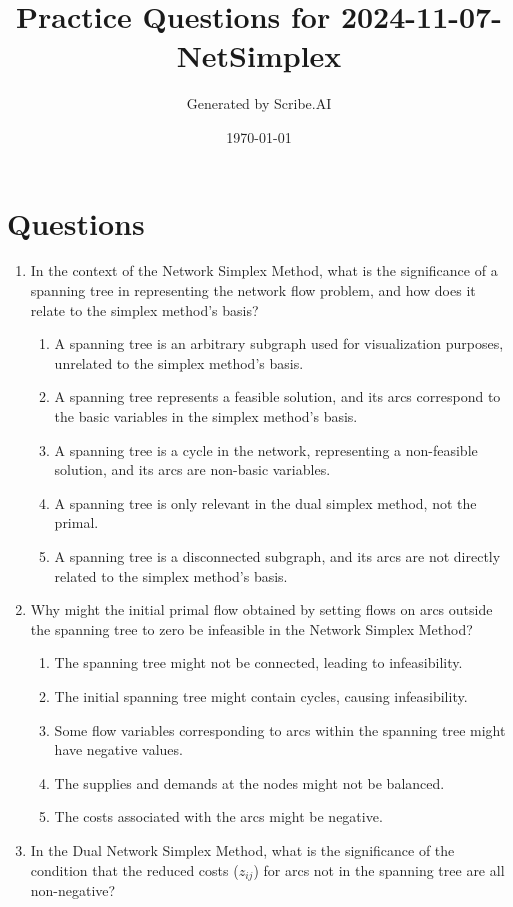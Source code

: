 \documentclass{article}%
\title{Practice Questions for 2024{-}11{-}07{-}NetSimplex}%
\author{Generated by Scribe.AI}%
\date{\today}%
\begin{document}
%
\normalsize%
\maketitle%
\section{Questions}%
\label{sec:Questions}%
\begin{enumerate}%
\item In the context of the Network Simplex Method, what is the significance of a spanning tree in representing the network flow problem, and how does it relate to the simplex method's basis?%
\begin{enumerate}%
\item A spanning tree is an arbitrary subgraph used for visualization purposes, unrelated to the simplex method's basis.%
\item A spanning tree represents a feasible solution, and its arcs correspond to the basic variables in the simplex method's basis.%
\item A spanning tree is a cycle in the network, representing a non-feasible solution, and its arcs are non-basic variables.%
\item A spanning tree is only relevant in the dual simplex method, not the primal.%
\item A spanning tree is a disconnected subgraph, and its arcs are not directly related to the simplex method's basis.%
\end{enumerate}%
\vspace{1em}%
\item Why might the initial primal flow obtained by setting flows on arcs outside the spanning tree to zero be infeasible in the Network Simplex Method?%
\begin{enumerate}%
\item The spanning tree might not be connected, leading to infeasibility.%
\item The initial spanning tree might contain cycles, causing infeasibility.%
\item Some flow variables corresponding to arcs within the spanning tree might have negative values.%
\item The supplies and demands at the nodes might not be balanced.%
\item The costs associated with the arcs might be negative.%
\end{enumerate}%
\vspace{1em}%
\item In the Dual Network Simplex Method, what is the significance of the condition that the reduced costs ($z_{ij}$) for arcs not in the spanning tree are all non-negative?%

\end{enumerate}
\end{document}
